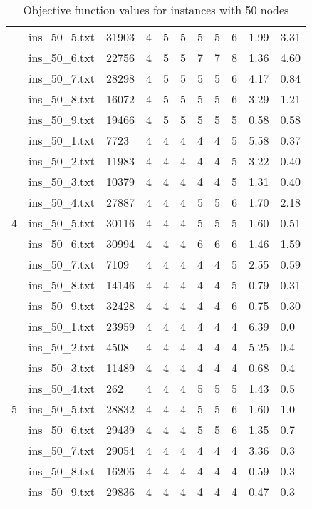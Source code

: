\begin{table}[]
\begin{tabular}{lllllllllll}
& ins\_50\_5.txt & 31903 & 4 & 5 & 5 & 5  & 5   & 6 &1.99	&3.31	\\
& ins\_50\_6.txt & 22756 & 4 & 5 & 5 & 7  & 7   & 8 &1.36	&4.60	\\
& ins\_50\_7.txt & 28298 & 4 & 5 & 5 & 5  & 5   & 6 &4.17	&0.84	\\
& ins\_50\_8.txt & 16072 & 4 & 5 & 5 & 5  & 5   & 6 &3.29	&1.21	\\
& ins\_50\_9.txt & 19466 & 4 & 5 & 5 & 5  & 5   & 5 &0.58	&0.58	\\
\hline 
\multirow{9}{*}{4}
& ins\_50\_1.txt & 7723  & 4 & 4 & 4 & 4  & 4   & 5 &5.58	&0.37\\
& ins\_50\_2.txt & 11983 & 4 & 4 & 4 & 4  & 4   & 5 &3.22	&0.40\\
& ins\_50\_3.txt & 10379 & 4 & 4 & 4 & 4  & 4   & 5 &1.31	&0.40\\
& ins\_50\_4.txt & 27887 & 4 & 4 & 4 & 5  & 5   & 6 &1.70	&2.18\\
& ins\_50\_5.txt & 30116 & 4 & 4 & 4 & 5  & 5   & 5 &1.60	&0.51\\
& ins\_50\_6.txt & 30994 & 4 & 4 & 4 & 6  & 6   & 6 &1.46	&1.59\\
& ins\_50\_7.txt & 7109  & 4 & 4 & 4 & 4  & 4   & 5 &2.55	&0.59\\
& ins\_50\_8.txt & 14146 & 4 & 4 & 4 & 4  & 4   & 5 &0.79	&0.31\\
& ins\_50\_9.txt & 32428 & 4 & 4 & 4 & 4  & 4   & 6 &0.75	&0.30\\
\hline 
\multirow{9}{*}{5}
& ins\_50\_1.txt & 23959 & 4 & 4 & 4 & 4  & 4   & 4 &6.39	&0.0\\
& ins\_50\_2.txt & 4508  & 4 & 4 & 4 & 4  & 4   & 4 &5.25	&0.4\\
& ins\_50\_3.txt & 11489 & 4 & 4 & 4 & 4  & 4   & 4 &0.68	&0.4\\
& ins\_50\_4.txt & 262   & 4 & 4 & 4 & 5  & 5   & 5 &1.43	&0.5\\
& ins\_50\_5.txt & 28832 & 4 & 4 & 4 & 5  & 5   & 6 &1.60	&1.0\\
& ins\_50\_6.txt & 29439 & 4 & 4 & 4 & 5  & 5   & 6 &1.35	&0.7\\
& ins\_50\_7.txt & 29054 & 4 & 4 & 4 & 4  & 4   & 4 &3.36	&0.3\\
& ins\_50\_8.txt & 16206 & 4 & 4 & 4 & 4  & 4   & 4 &0.59	&0.3\\
& ins\_50\_9.txt & 29836 & 4 & 4 & 4 & 4  & 4   & 4 &0.47	&0.3
\end{tabular}
\caption{Objective function values for instances with 50 nodes}
\label{tab:ins50}
\end{table}


